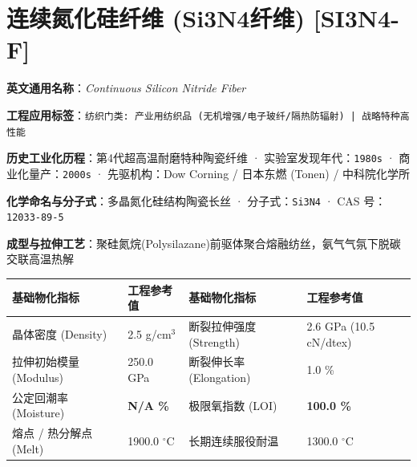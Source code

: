 \documentclass[11pt,openright,twoside,UTF8]{ctexbook}
\begin{document}
\section{连续氮化硅纤维 (Si3N4纤维) [SI3N4-F]}
\label{sec:si3n4-f}

\noindent\textbf{英文通用名称}：\textit{Continuous Silicon Nitride Fiber}\par
\noindent\textbf{工程应用标签}：\texttt{纺织门类: 产业用纺织品 (无机增强/电子玻纤/隔热防辐射) | 战略特种高性能}\par
\noindent\textbf{历史工业化历程}：第4代超高温耐磨特种陶瓷纤维 · 实验室发现年代：\texttt{1980s} · 商业化量产：\texttt{2000s} · 先驱机构：Dow Corning / 日本东燃 (Tonen) / 中科院化学所\par
\noindent\textbf{化学命名与分子式}：多晶氮化硅结构陶瓷长丝 · 分子式：\texttt{Si3N4} · CAS 号：\texttt{12033-89-5}\par
\noindent\textbf{成型与拉伸工艺}：聚硅氮烷(Polysilazane)前驱体聚合熔融纺丝，氨气气氛下脱碳交联高温热解\par

\vspace{0.15cm}
\begin{center}
\small
\begin{tabularx}{\textwidth}{p{3.8cm}Xp{3.8cm}X}
\toprule
\textbf{基础物化指标} & \textbf{工程参考值} & \textbf{基础物化指标} & \textbf{工程参考值} \\
\midrule
晶体密度 (Density) & 2.5 g/cm$^3$ & 断裂拉伸强度 (Strength) & 2.6 GPa (10.5 cN/dtex) \\
拉伸初始模量 (Modulus) & 250.0 GPa & 断裂伸长率 (Elongation) & 1.0 \% \\
公定回潮率 (Moisture) & \textbf{N/A \%} & 极限氧指数 (LOI) & \textbf{100.0 \%} \\
熔点 / 热分解点 (Melt) & 1900.0 $^\circ\mathrm{C}$ & 长期连续服役耐温 & 1300.0 $^\circ\mathrm{C}$ \\
\bottomrule
\end{tabularx}
\end{center}
\vspace{0.15cm}
\end{document}
